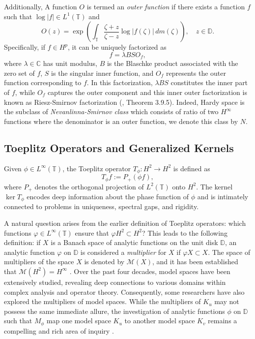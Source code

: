 \documentclass[12pt,a4paper]{amsart}
\begin{document}
Additionally, A function \( O \) is termed an \emph{outer function} if there exists a function \( f \) such that \( \log |f| \in L^1(\mathbb{T}) \) and
\[
O(z) = \exp\left( \int_{\mathbb{T}} \frac{\zeta + z}{\zeta - z} \log |f(\zeta)| \, dm(\zeta) \right), \quad z \in \mathbb{D}.
\]  Specifically, if \( f \in H^p \), it can be uniquely factorized as
\[
f = \lambda B S O_f,
\]
where \( \lambda \in \mathbb{C} \) has unit modulus, \( B \) is the Blaschke product associated with the zero set of \( f \), \( S \) is the singular inner function, and \( O_f \) represents the outer function corresponding to \( f \). In this factorization, \( \lambda B S \) constitutes the inner part of \( f \), while \( O_f \) captures the outer component and this inner outer factorization is known as Riesz-Smirnov factorization (\cite{N2}, Theorem 3.9.5). Indeed, Hardy space is the subclass of \emph{Nevanlinna-Smirnov class} which consists of ratio of two $H^\infty$ functions where the denominator is an outer function, we denote this class  by \( N \).


\subsection{Toeplitz Operators and Generalized Kernels}

Given $\phi \in L^\infty(\mathbb T)$, the Toeplitz operator $T_\phi: H^2 \to H^2$ is defined as
$$
T_\phi f := P_+(\phi f),
$$
where $P_+$ denotes the orthogonal projection of $L^2(\mathbb T)$ onto $H^2$. The kernel $\ker T_\phi$ encodes deep information about the phase function of $\phi$ and is intimately connected to problems in uniqueness, spectral gaps, and rigidity.

A natural question arises from the earlier definition of Toeplitz operators: which functions \( \varphi \in L^\infty(\mathbb{T}) \) ensure that \( \varphi H^2 \subset H^2 \)? This leads to the following definition: if \( X \) is a Banach space of analytic functions on the unit disk \( \mathbb{D} \), an analytic function \( \varphi \) on \( \mathbb{D} \) is considered a \emph{multiplier} for \( X \) if \( \varphi X \subset X \). The space of multipliers of the space \( X \) is denoted by \( \mathcal{M}(X) \), and it has been established that \( \mathcal{M}(H^2) = H^\infty \) \cite{mashregibook,mashregi}. Over the past four decades, model spaces have been extensively studied, revealing deep connections to various domains within complex analysis and operator theory. Consequently, some researchers have also explored the multipliers of model spaces. While the multipliers of \( K_u \) may not possess the same immediate allure, the investigation of analytic functions \( \phi \) on \( \mathbb{D} \) such that \(M_\phi\) map one model space \( K_u \) to another model space \( K_v \) remains a compelling and rich area of inquiry \cite{FRR18,camara2018multipliers,bhardwaj2024}.
\end{document}
